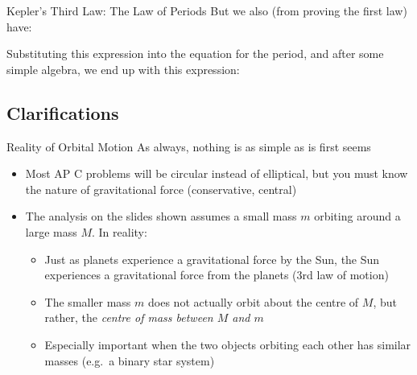 \documentclass[12pt,compress,aspectratio=169]{beamer}
\begin{document}
\begin{frame}{Kepler's Third Law: The Law of Periods}
  But we also (from proving the first law) have:


  Substituting this expression into the equation for the period, and after
  some simple algebra, we end up with this expression:

\end{frame}





\subsection{Clarifications}

\begin{frame}{Reality of Orbital Motion}
  As always, nothing is as simple as is first seems
  \begin{itemize}
  \item Most AP C problems will be circular instead of elliptical, but you must
    know the nature of gravitational force (conservative, central)
  \item The analysis on the slides shown assumes a small mass $m$ orbiting
    around a large mass $M$. In reality:
    \begin{itemize}
    \item Just as planets experience a gravitational force by the Sun, the Sun
      experiences a gravitational force from the planets (3rd law of motion)
    \item The smaller mass $m$ does not actually orbit about the centre of $M$,
      but rather, the \emph{centre of mass between $M$ and $m$}
    \item Especially important when the two objects orbiting each other has
      similar masses (e.g.\ a binary star system)
    \end{itemize}
  \end{itemize}
\end{frame}
\end{document}
